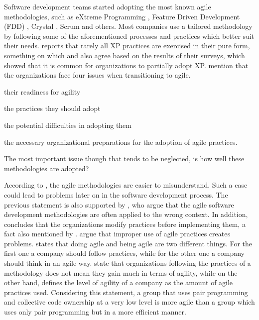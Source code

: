 Software development teams started adopting the most known agile methodologies, such as eXtreme Programming \cite{Beck:2004:EPE:1076267}, Feature Driven Development (FDD) \cite{Palmer:2001:PGF:600044}, Crystal \cite{Cockburn:2004:CCH:1406822}, Scrum \cite{scrum} and others. Most companies use a tailored methodology by following some of the aforementioned processes and practices which better suit their needs. \citet{williams2004toward} reports that rarely all XP practices are exercised in their pure form, something on which \citet{Reifer} and \citet{aveling} also agree based on the results of their surveys, which showed that it is common for organizations to partially adopt XP. \citet{sidky} mention that the organizations face four issues when transitioning to agile.
\begin{inparaenum} [a\upshape)]
\item their readiness for agility
\item the practices they should adopt
\item the potential difficulties in adopting them
\item the necessary organizational preparations for the adoption of agile practices. 
\end{inparaenum}
The most important issue though that tends to be neglected, is how well these methodologies are adopted?

According to \citet{6427226}, the agile methodologies are easier to misunderstand. Such a case could lead to problems later on in the software development process. The previous statement is also supported by \citet{cefam}, who argue that the agile software development methodologies are often applied to the wrong context. In addition, \citet{1629340} concludes that the organizations modify practices before implementing them, a fact also mentioned by \citet{1579312}. \citet{hossain} argue that improper use of agile practices creates problems. \citet{sahota} states that doing agile and being agile are two different things. For the first one a company should follow practices, while for the other one a company should think in an agile way. \citet{lappoA04} state that organizations following the practices of a methodology does not mean they gain much in terms of agility, while on the other hand, \citet{sidky_dissertation} defines the level of agility of a company as the amount of agile practices used. Considering this statement, a group that uses pair programming and collective code ownership at a very low level is more agile than a group which uses only pair programming but in a more efficient manner.

